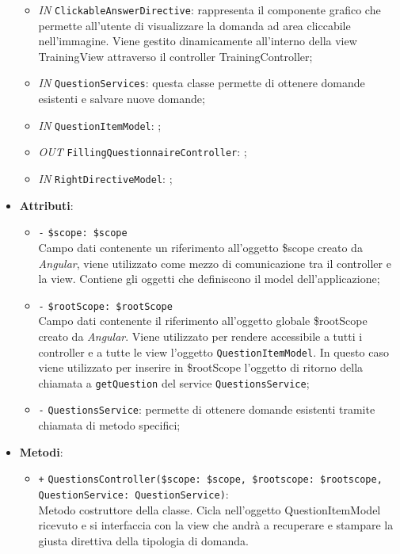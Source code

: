 \begin{itemize}
\begin{itemize}
		\item \textit{IN} \texttt{ClickableAnswerDirective}: rappresenta il componente grafico che permette all'utente di visualizzare la domanda ad area cliccabile nell'immagine. Viene gestito dinamicamente all'interno della view TrainingView attraverso il controller TrainingController;  
		\item \textit{IN} \texttt{QuestionServices}: questa classe permette di ottenere domande esistenti e salvare nuove domande;
		\item \textit{IN} \texttt{QuestionItemModel}: ;
		\item \textit{OUT} \texttt{FillingQuestionnaireController}: ;
		\item \textit{IN} \texttt{RightDirectiveModel}: ;		
	\end{itemize}
	\item \textbf{Attributi}:
	\begin{itemize}
		\item \texttt{-} \texttt{\$scope: \$scope} \\
		Campo dati contenente un riferimento all’oggetto \$scope creato da \textit{Angular}, viene utilizzato come mezzo di comunicazione tra il controller e la view. Contiene gli oggetti che definiscono il model dell’applicazione;
		\item \texttt{-} \texttt{\$rootScope: \$rootScope} \\
		Campo dati contenente il riferimento all'oggetto globale \$rootScope creato da \textit{Angular}. Viene utilizzato per rendere accessibile a tutti i controller e a tutte le view l'oggetto \texttt{QuestionItemModel}. In questo caso viene utilizzato per inserire in \$rootScope l'oggetto di ritorno della chiamata a \texttt{getQuestion} del service \texttt{QuestionsService};
		\item \texttt{-} \texttt{QuestionsService}: permette di ottenere domande esistenti tramite chiamata di metodo specifici;
	\end{itemize}
	\item \textbf{Metodi}:
	\begin{itemize}
		\item \texttt{+} \texttt{QuestionsController(\$scope: \$scope, \$rootscope: \$rootscope, QuestionService: QuestionService)}: \\ Metodo costruttore della classe. Cicla nell'oggetto QuestionItemModel ricevuto e si interfaccia con la view che andrà a recuperare e stampare la giusta direttiva della tipologia di domanda. \\

\end{itemize}
\end{itemize}
